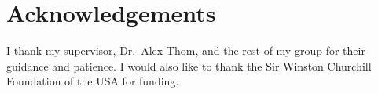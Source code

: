 \documentclass[final,3p,times,twocolumn]{elsarticle}
\begin{document}
\section*{Acknowledgements}
I thank my supervisor, Dr.\ Alex Thom, and the rest of my group for their guidance and patience. I would also like to thank the Sir Winston Churchill Foundation of the USA for funding.


%
\end{document}
